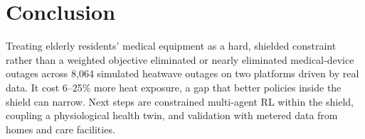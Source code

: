 \documentclass[conference]{IEEEtran}
\begin{document}
\section{Conclusion}
Treating elderly residents' medical equipment as a hard, shielded constraint rather than a weighted objective eliminated or nearly eliminated medical-device outages across 8,064 simulated heatwave outages on two platforms driven by real data. It cost 6--25\% more heat exposure, a gap that better policies inside the shield can narrow. Next steps are constrained multi-agent RL within the shield, coupling a physiological health twin, and validation with metered data from homes and care facilities.



\end{document}
